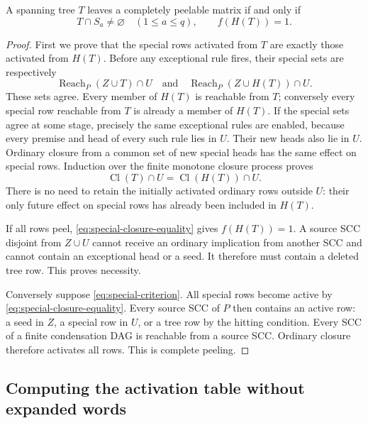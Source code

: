 \begin{lemma}\label{lem:special-criterion}
A spanning tree $T$ leaves a completely peelable matrix if and only if
\begin{equation}\label{eq:special-criterion}
       T\cap S_a\ne\varnothing\quad(1\leq a\leq q),
                    \qquad f(H(T))=1.
\end{equation}
\end{lemma}
\begin{proof}
First we prove that the special rows activated from $T$ are exactly those
activated from $H(T)$.  Before any exceptional rule fires, their special
sets are respectively
\[
     \operatorname{Reach}_P(Z\cup T)\cap U
       \quad\text{and}\quad
     \operatorname{Reach}_P(Z\cup H(T))\cap U.
\]
These sets agree.  Every member of $H(T)$ is reachable from $T$; conversely
every special row reachable from $T$ is already a member of $H(T)$.
If the special sets agree at some stage, precisely the same exceptional
rules are enabled, because every premise and head of every such rule
lies in $U$.  Their new heads also lie in $U$.  Ordinary closure from a
common set of new special heads has the same effect on special rows.
Induction over the finite monotone closure process proves
\begin{equation}\label{eq:special-closure-equality}
          \operatorname{Cl}(T)\cap U
             =\operatorname{Cl}(H(T))\cap U.
\end{equation}
There is no need to retain the initially activated ordinary rows outside
$U$: their only future effect on special rows has already been included
in $H(T)$.

If all rows peel, \eqref{eq:special-closure-equality} gives $f(H(T))=1$.
A source SCC disjoint from $Z\cup U$ cannot receive an ordinary implication
from another SCC and cannot contain an exceptional head or a seed.
It therefore must contain a deleted tree row.  This proves necessity.

Conversely suppose \eqref{eq:special-criterion}.  All special rows become
active by \eqref{eq:special-closure-equality}.  Every source SCC of $P$
then contains an active row: a seed in $Z$, a special row in $U$, or a tree
row by the hitting condition.  Every SCC of a finite condensation DAG is
reachable from a source SCC.  Ordinary closure therefore activates all
rows.  This is complete peeling.
\end{proof}

\subsection{Computing the activation table without expanded words}

